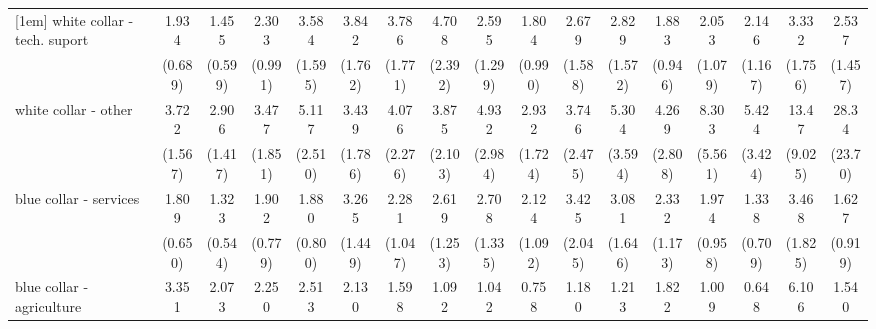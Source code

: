 {\begin{tabular}{l*{16}{c}}
[1em]
white collar - tech. suport&       1.934         &       1.455         &       2.303         &       3.584\sym{**} &       3.842\sym{**} &       3.786\sym{**} &       4.708\sym{**} &       2.595         &       1.804         &       2.679         &       2.829         &       1.883         &       2.053         &       2.146         &       3.332\sym{*}  &       2.537         \\
                    &     (0.689)         &     (0.599)         &     (0.991)         &     (1.595)         &     (1.762)         &     (1.771)         &     (2.392)         &     (1.299)         &     (0.990)         &     (1.588)         &     (1.572)         &     (0.946)         &     (1.079)         &     (1.167)         &     (1.756)         &     (1.457)         \\
[1em]
white collar - other&       3.722\sym{**} &       2.906\sym{*}  &       3.477\sym{*}  &       5.117\sym{***}&       3.439\sym{*}  &       4.076\sym{*}  &       3.875\sym{*}  &       4.932\sym{**} &       2.932         &       3.746\sym{*}  &       5.304\sym{*}  &       4.269\sym{*}  &       8.303\sym{**} &       5.424\sym{**} &       13.47\sym{***}&       28.34\sym{***}\\
                    &     (1.567)         &     (1.417)         &     (1.851)         &     (2.510)         &     (1.786)         &     (2.276)         &     (2.103)         &     (2.984)         &     (1.724)         &     (2.475)         &     (3.594)         &     (2.808)         &     (5.561)         &     (3.424)         &     (9.025)         &     (23.70)         \\
[1em]
blue collar - services&       1.809         &       1.323         &       1.902         &       1.880         &       3.265\sym{**} &       2.281         &       2.619\sym{*}  &       2.708\sym{*}  &       2.124         &       3.425\sym{*}  &       3.081\sym{*}  &       2.332         &       1.974         &       1.338         &       3.468\sym{*}  &       1.627         \\
                    &     (0.650)         &     (0.544)         &     (0.779)         &     (0.800)         &     (1.449)         &     (1.047)         &     (1.253)         &     (1.335)         &     (1.092)         &     (2.045)         &     (1.646)         &     (1.173)         &     (0.958)         &     (0.709)         &     (1.825)         &     (0.919)         \\
[1em]
blue collar - agriculture&       3.351\sym{*}  &       2.073         &       2.250         &       2.513         &       2.130         &       1.598         &       1.092         &       1.042         &       0.758         &       1.180         &       1.213         &       1.822         &       1.009         &       0.648         &       6.106\sym{*}  &       1.540         \\

\end{tabular}}
